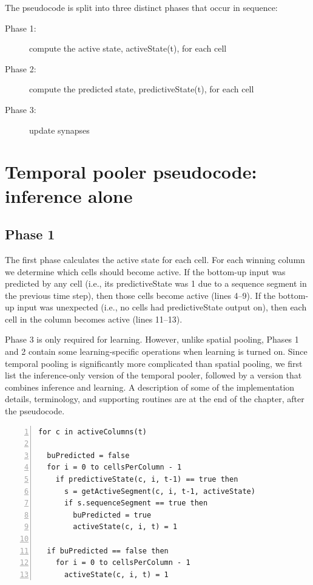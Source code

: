 \documentclass{report}
\begin{document}
The pseudocode is split into three distinct phases that occur in sequence:
\begin{description}
\item[Phase 1:] compute the active state, activeState(t), for each cell
\item[Phase 2:] compute the predicted state, predictiveState(t), for each cell
\item[Phase 3:] update synapses
\end{description}

\section*{Temporal pooler pseudocode: inference alone}

\subsection*{Phase 1}
The first phase calculates the active state for each cell. For each
winning column we determine which cells should become active. If the
bottom-up input was predicted by any cell (i.e., its predictiveState
was 1 due to a sequence segment in the previous time step), then those
cells become active (lines 4--9). If the bottom-up input was unexpected
(i.e., no cells had predictiveState output on), then each cell in the
column becomes active (lines 11--13).

Phase 3 is only required for learning. However, unlike spatial
pooling, Phases 1 and 2 contain some learning-specific operations when
learning is turned on. Since temporal pooling is significantly more
complicated than spatial pooling, we first list the inference-only
version of the temporal pooler, followed by a version that combines
inference and learning. A description of some of the implementation
details, terminology, and supporting routines are at the end of the
chapter, after the pseudocode.

\begin{lstlisting}[numbers=left]
for c in activeColumns(t)

  buPredicted = false
  for i = 0 to cellsPerColumn - 1
    if predictiveState(c, i, t-1) == true then
      s = getActiveSegment(c, i, t-1, activeState)
      if s.sequenceSegment == true then
        buPredicted = true
        activeState(c, i, t) = 1

  if buPredicted == false then
    for i = 0 to cellsPerColumn - 1
      activeState(c, i, t) = 1
\end{lstlisting}
\end{document}
